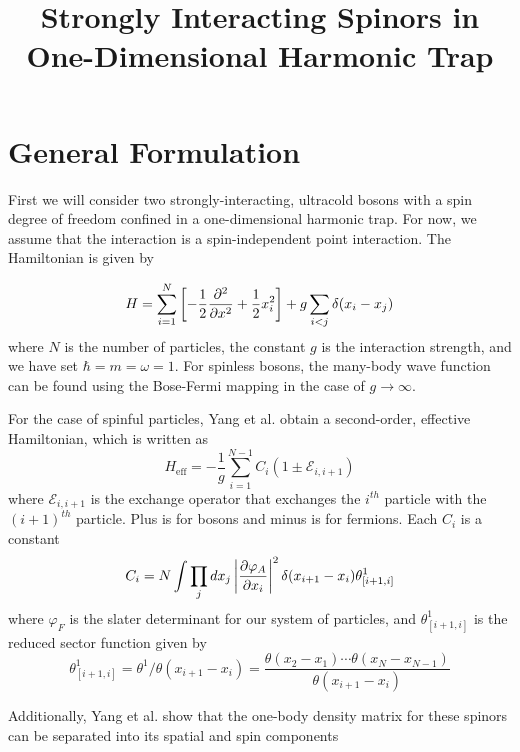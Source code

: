 \documentclass[onecolumn,english,aps,pra]{revtex4}
\begin{document}
\title{Strongly Interacting Spinors in One-Dimensional Harmonic Trap}

\maketitle

\section{General Formulation}

First we will consider two strongly-interacting, ultracold bosons with a spin degree of freedom confined in a one-dimensional harmonic trap. For now, we assume that the interaction is a spin-independent point interaction. The Hamiltonian is given by

\begin{equation}
    H = \sum_{i = 1}^{N} \left[ -\frac{1}{2} \pdv[2]{}{x} + \frac{1}{2} x_i^2 \right]
            + g \sum_{i < j} \delta(x_i - x_j)
	\end{equation}
%
where $N$ is the number of particles, the constant $g$ is the interaction strength, and we have set $\hbar = m = \omega = 1$. For spinless bosons, the many-body wave function can be found using the Bose-Fermi mapping \cite{girardeau1960relationship} in the case of $g \rightarrow \infty$.

For the case of spinful particles, Yang et al. \cite{yang2015strongly} obtain a second-order, effective Hamiltonian, which is written as
%
\begin{equation}
H_{\text{eff}} = -\frac{1}{g} \sum_{i = 1}^{N - 1}C_i(1 \pm \mathcal{E}_{i, i+1})
\label{spinchain}
\end{equation}
%
where $\mathcal{E}_{i, i+1}$ is the exchange operator that exchanges the $i^{th}$ particle with the $(i + 1)^{th}$ particle. Plus is for bosons and minus is for fermions. Each $C_i$ is a constant 
%
\begin{equation}
C_i = N \int \prod_j dx_j \left| \pdv{\varphi_A}{x_i} \right|^2 \delta(x_{i + 1} - x_{i}) \theta^1_{[i+1, i]}
\end{equation}
%
where $\varphi_F$ is the slater determinant for our system of particles, and $\theta^1_{[i+1, i]}$ is the reduced sector function given by
%
\[ \theta^1_{[i+1, i]} = \theta^1 / \theta(x_{i + 1} - x_i) 
= \frac{\theta(x_2 - x_1) \cdots \theta(x_N - x_{N-1})}{\theta(x_{i + 1} - x_i)} \]

Additionally, Yang et al. show that the one-body density matrix for these spinors can be separated into its spatial and spin components
\end{document}
